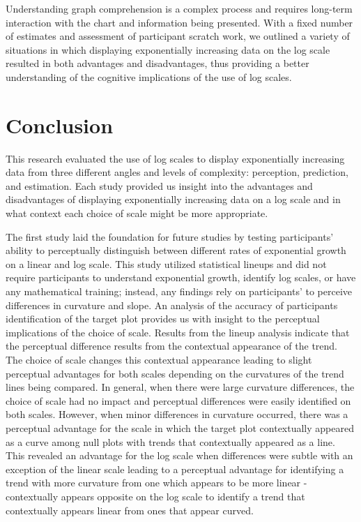 \documentclass[print]{nuthesis}
\begin{document}
Understanding graph comprehension is a complex process and requires long-term interaction with the chart and information being presented.
With a fixed number of estimates and assessment of participant scratch work, we outlined a variety of situations in which displaying exponentially increasing data on the log scale resulted in both advantages and disadvantages, thus providing a better understanding of the cognitive implications of the use of log scales.

\hypertarget{conclusion}{%
\chapter{Conclusion}\label{conclusion}}

This research evaluated the use of log scales to display exponentially increasing data from three different angles and levels of complexity: perception, prediction, and estimation.
Each study provided us insight into the advantages and disadvantages of displaying exponentially increasing data on a log scale and in what context each choice of scale might be more appropriate.

The first study laid the foundation for future studies by testing participants' ability to perceptually distinguish between different rates of exponential growth on a linear and log scale.
This study utilized statistical lineups and did not require participants to understand exponential growth, identify log scales, or have any mathematical training; instead, any findings rely on participants' to perceive differences in curvature and slope.
An analysis of the accuracy of participants identification of the target plot provides us with insight to the perceptual implications of the choice of scale.
Results from the lineup analysis indicate that the perceptual difference results from the contextual appearance of the trend.
The choice of scale changes this contextual appearance leading to slight perceptual advantages for both scales depending on the curvatures of the trend lines being compared.
In general, when there were large curvature differences, the choice of scale had no impact and perceptual differences were easily identified on both scales.
However, when minor differences in curvature occurred, there was a perceptual advantage for the scale in which the target plot contextually appeared as a curve among null plots with trends that contextually appeared as a line.
This revealed an advantage for the log scale when differences were subtle with an exception of the linear scale leading to a perceptual advantage for identifying a trend with more curvature from one which appears to be more linear - contextually appears opposite on the log scale to identify a trend that contextually appears linear from ones that appear curved.
\end{document}
